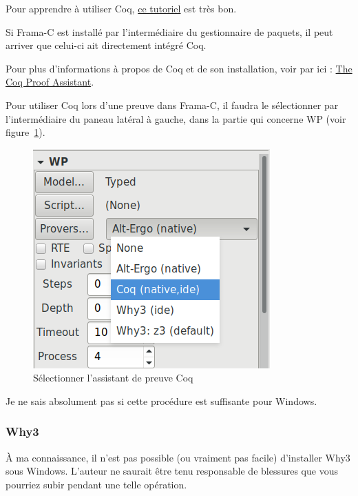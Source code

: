 \documentclass[12pt,francais,]{scrbook}
\newenvironment{zdsalertblock}[1]{%
  \tcolorbox[beamer,%
    noparskip,breakable,
    colback=LightCoral,colframe=DarkRed,%
    colbacklower=Tomato,%
    title=#1]
}{\endtcolorbox}
\newenvironment{zdsblock}[1]{%
  \tcolorbox[beamer,%
    noparskip,breakable,
    colback=LightBlue,colframe=DarkBlue,%
    colbacklower=DarkBlue,%
    title=#1]
}{\endtcolorbox}
\begin{document}
Pour apprendre à utiliser Coq,
\href{http://www.cis.upenn.edu/~bcpierce/sf/current/index.html}{ce
tutoriel} est très bon.

\begin{zdsblock}{Information}
Si Frama-C est installé par
l'intermédiaire du gestionnaire de paquets, il peut
arriver que celui-ci ait directement intégré Coq.
\end{zdsblock}

Pour plus d'informations à propos de Coq et de son installation, voir
par ici : \href{https://coq.inria.fr/}{The Coq Proof Assistant}.

Pour utiliser Coq lors d'une preuve dans Frama-C, il faudra le
sélectionner par l'intermédiaire du paneau latéral à gauche, dans la
partie qui concerne WP (voir figure~\ref{fig:select-coq}).

\begin{figure}[htbp]
\centering
\includegraphics[scale=0.5]{1-2-select-coq.png}
\caption{Sélectionner l'assistant de preuve Coq}
\label{fig:select-coq}
\end{figure}

\begin{zdsblock}{Information}
  Je ne sais absolument pas si cette procédure est suffisante pour Windows.
\end{zdsblock}

\subsubsection{Why3}\label{why3}

\begin{zdsalertblock}{Attention}
  À ma connaissance, il n'est pas
  possible (ou vraiment pas facile) d'installer Why3 sous
  Windows. L'auteur ne saurait être tenu responsable de
  blessures que vous pourriez subir pendant une telle
  opération.
\end{zdsalertblock}
\end{document}
